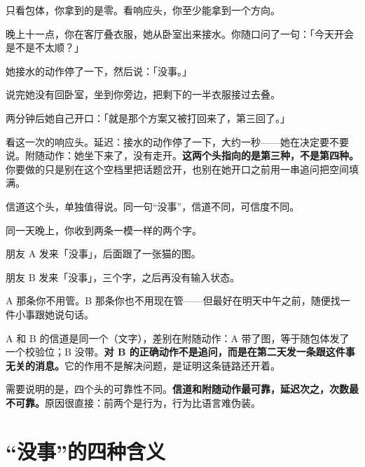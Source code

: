 只看包体，你拿到的是零。看响应头，你至少能拿到一个方向。

\par
\begin{mdquote}
晚上十一点，你在客厅叠衣服，她从卧室出来接水。你随口问了一句：「今天开会是不是不太顺？」\par
\vspace{0.3\baselineskip}
她接水的动作停了一下，然后说：「没事。」\par
\vspace{0.3\baselineskip}
说完她没有回卧室，坐到你旁边，把剩下的一半衣服接过去叠。\par
\vspace{0.3\baselineskip}
两分钟后她自己开口：「就是那个方案又被打回来了，第三回了。」\par
\end{mdquote}

看这一次的响应头。延迟：接水的动作停了一下，大约一秒——她在决定要不要说。附随动作：她坐下来了，没有走开。\textbf{这两个头指向的是第三种，不是第四种。}你要做的只是别在这个空档里把话题岔开，也别在她开口之前用一串追问把空间填满。

信道这个头，单独值得说。同一句“没事”，信道不同，可信度不同。

\par
\begin{mdquote}
同一天晚上，你收到两条一模一样的两个字。\par
\vspace{0.3\baselineskip}
朋友 A 发来「没事」，后面跟了一张猫的图。\par
\vspace{0.3\baselineskip}
朋友 B 发来「没事」，三个字，之后再没有输入状态。\par
\vspace{0.3\baselineskip}
A 那条你不用管。B 那条你也不用现在管——但最好在明天中午之前，随便找一件小事跟她说句话。\par
\end{mdquote}

A 和 B 的信道是同一个（文字），差别在附随动作：A 带了图，等于随包体发了一个校验位；B 没带。\textbf{对 B 的正确动作不是追问，而是在第二天发一条跟这件事无关的消息。}它的作用不是解决问题，是证明这条链路还开着。

需要说明的是，四个头的可靠性不同。\textbf{信道和附随动作最可靠，延迟次之，次数最不可靠。}原因很直接：前两个是行为，行为比语言难伪装。

\section{“没事”的四种含义}

